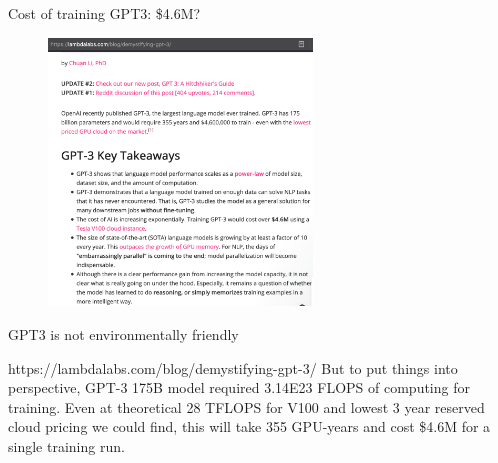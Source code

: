 \begin{frame}{Cost of training GPT3: \$4.6M?}

\vfill

	\begin{figure}
		\centering
		\includegraphics[width=7cm]{figure/gpt3cost.png}
	\end{figure}

\vfill

\end{frame}



\begin{vbframe}{GPT3 is not environmentally friendly}

\vfill

  \begin{block}{https://lambdalabs.com/blog/demystifying-gpt-3/}
      But to put things into perspective, GPT-3 175B model
      required 3.14E23 FLOPS of computing for training. Even
      at theoretical 28 TFLOPS for V100 and lowest 3 year
      reserved cloud pricing we could find, this will take
      355 GPU-years and cost \$4.6M for a single training
      run.
  \end{block}

\vfill

\end{vbframe}

